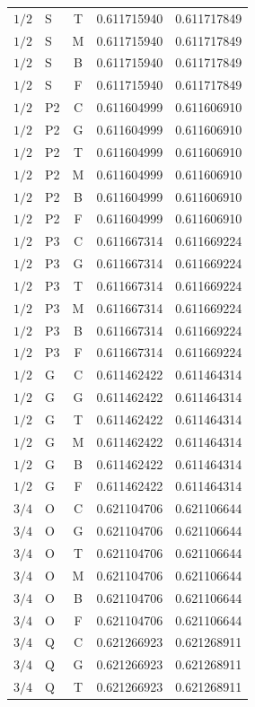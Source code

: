 \begin{longtable}{clcrr}
$1/2$ & S & T & 0.611715940 & 0.611717849 \\
$1/2$ & S & M & 0.611715940 & 0.611717849 \\
$1/2$ & S & B & 0.611715940 & 0.611717849 \\
$1/2$ & S & F & 0.611715940 & 0.611717849 \\
$1/2$ & P2 & C & 0.611604999 & 0.611606910 \\
$1/2$ & P2 & G & 0.611604999 & 0.611606910 \\
$1/2$ & P2 & T & 0.611604999 & 0.611606910 \\
$1/2$ & P2 & M & 0.611604999 & 0.611606910 \\
$1/2$ & P2 & B & 0.611604999 & 0.611606910 \\
$1/2$ & P2 & F & 0.611604999 & 0.611606910 \\
$1/2$ & P3 & C & 0.611667314 & 0.611669224 \\
$1/2$ & P3 & G & 0.611667314 & 0.611669224 \\
$1/2$ & P3 & T & 0.611667314 & 0.611669224 \\
$1/2$ & P3 & M & 0.611667314 & 0.611669224 \\
$1/2$ & P3 & B & 0.611667314 & 0.611669224 \\
$1/2$ & P3 & F & 0.611667314 & 0.611669224 \\
$1/2$ & G & C & 0.611462422 & 0.611464314 \\
$1/2$ & G & G & 0.611462422 & 0.611464314 \\
$1/2$ & G & T & 0.611462422 & 0.611464314 \\
$1/2$ & G & M & 0.611462422 & 0.611464314 \\
$1/2$ & G & B & 0.611462422 & 0.611464314 \\
$1/2$ & G & F & 0.611462422 & 0.611464314 \\
$3/4$ & O & C & 0.621104706 & 0.621106644 \\
$3/4$ & O & G & 0.621104706 & 0.621106644 \\
$3/4$ & O & T & 0.621104706 & 0.621106644 \\
$3/4$ & O & M & 0.621104706 & 0.621106644 \\
$3/4$ & O & B & 0.621104706 & 0.621106644 \\
$3/4$ & O & F & 0.621104706 & 0.621106644 \\
$3/4$ & Q & C & 0.621266923 & 0.621268911 \\
$3/4$ & Q & G & 0.621266923 & 0.621268911 \\
$3/4$ & Q & T & 0.621266923 & 0.621268911 \\

\end{longtable}
